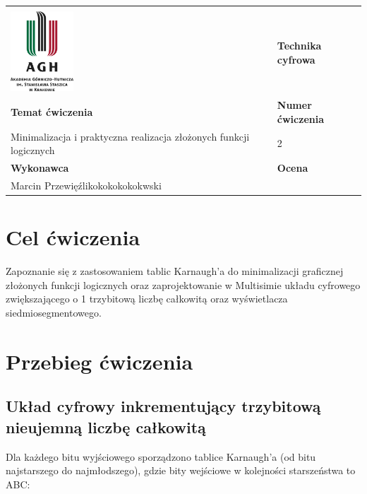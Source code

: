 \documentclass[12pt,a4paper]{article}
\begin{document}
\begin{table}[]
\label{my-label}
\begin{tabular}{|p{7.5cm}|p{7.5cm}|}
\hline
									           					&                           \\
\includegraphics[height=3cm]{logo}             					& \textbf{Technika cyfrowa} \\ \hline
\multicolumn{1}{|l|}{\textbf{Temat ćwiczenia}} 					& \textbf{Numer ćwiczenia}  \\
\multicolumn{1}{|l|}{Minimalizacja i praktyczna realizacja złożonych funkcji logicznych}	& 2                         \\ \hline
\multicolumn{1}{|l|}{\textbf{Wykonawca}}       & \textbf{Ocena}            \\
\multicolumn{1}{|l|}{Marcin Przewięźlikokokokokokwski}          &                           \\ \hline
\end{tabular}
\end{table}

\section{Cel ćwiczenia}


Zapoznanie się z zastosowaniem tablic Karnaugh'a do minimalizacji graficznej złożonych funkcji logicznych oraz zaprojektowanie w Multisimie układu cyfrowego zwiększającego o 1 trzybitową liczbę całkowitą oraz wyświetlacza siedmiosegmentowego.

\section{Przebieg ćwiczenia}

\subsection{Układ cyfrowy inkrementujący trzybitową nieujemną liczbę całkowitą}
Dla każdego bitu wyjściowego sporządzono tablice Karnaugh'a (od bitu najstarszego do najmłodszego), gdzie bity wejściowe w kolejności starszeństwa to ABC:\\
\end{document}
